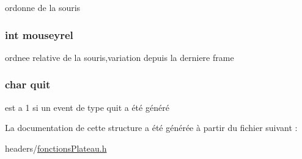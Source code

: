 ordonne de la souris \hypertarget{struct_input_a1599b1fc60e4088b883ec01c043ff605}{
\subsubsection[{mouseyrel}]{\setlength{\rightskip}{0pt plus 5cm}int {\bf mouseyrel}}}\label{struct_input_a1599b1fc60e4088b883ec01c043ff605}
ordnee relative de la souris,variation depuis la derniere frame \hypertarget{struct_input_a409d6906c2b3bc7112f51e004363ef4e}{
\subsubsection[{quit}]{\setlength{\rightskip}{0pt plus 5cm}char {\bf quit}}}\label{struct_input_a409d6906c2b3bc7112f51e004363ef4e}
est a 1 si un event de type quit a été généré 

\-La documentation de cette structure a été générée à partir du fichier suivant \-:\begin{DoxyCompactItemize}
\item 
headers/\hyperlink{fonctions_plateau_8h}{fonctions\-Plateau.\-h}\end{DoxyCompactItemize}
